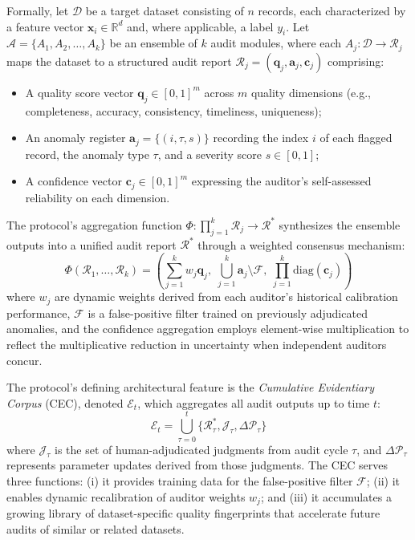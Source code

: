 \documentclass[12pt,a4paper]{ctexart}
\theoremstyle{definition}
\theoremstyle{remark}
\begin{document}
Formally, let $\mathcal{D}$ be a target dataset consisting of $n$ records, each characterized by a feature vector $\mathbf{x}_i \in \mathbb{R}^d$ and, where applicable, a label $y_i$. Let $\mathcal{A} = \{A_1, A_2, \ldots, A_k\}$ be an ensemble of $k$ audit modules, where each $A_j: \mathcal{D} \rightarrow \mathcal{R}_j$ maps the dataset to a structured audit report $\mathcal{R}_j = (\mathbf{q}_j, \mathbf{a}_j, \mathbf{c}_j)$ comprising:
\begin{itemize}
\item A quality score vector $\mathbf{q}_j \in [0,1]^m$ across $m$ quality dimensions (e.g., completeness, accuracy, consistency, timeliness, uniqueness);
\item An anomaly register $\mathbf{a}_j = \{(i, \tau, s)\}$ recording the index $i$ of each flagged record, the anomaly type $\tau$, and a severity score $s \in [0,1]$;
\item A confidence vector $\mathbf{c}_j \in [0,1]^m$ expressing the auditor's self-assessed reliability on each dimension.
\end{itemize}

The protocol's aggregation function $\Phi: \prod_{j=1}^k \mathcal{R}_j \rightarrow \mathcal{R}^*$ synthesizes the ensemble outputs into a unified audit report $\mathcal{R}^*$ through a weighted consensus mechanism:
\begin{equation}
\Phi(\mathcal{R}_1, \ldots, \mathcal{R}_k) = \left( \sum_{j=1}^k w_j \mathbf{q}_j, \; \bigcup_{j=1}^k \mathbf{a}_j \setminus \mathcal{F}, \; \prod_{j=1}^k \text{diag}(\mathbf{c}_j) \right)
\end{equation}
where $w_j$ are dynamic weights derived from each auditor's historical calibration performance, $\mathcal{F}$ is a false-positive filter trained on previously adjudicated anomalies, and the confidence aggregation employs element-wise multiplication to reflect the multiplicative reduction in uncertainty when independent auditors concur.

The protocol's defining architectural feature is the \textit{Cumulative Evidentiary Corpus} (CEC), denoted $\mathcal{E}_t$, which aggregates all audit outputs up to time $t$:
\begin{equation}
\mathcal{E}_t = \bigcup_{\tau=0}^{t} \{\mathcal{R}^*_\tau, \mathcal{J}_\tau, \Delta\mathcal{P}_\tau\}
\end{equation}
where $\mathcal{J}_\tau$ is the set of human-adjudicated judgments from audit cycle $\tau$, and $\Delta\mathcal{P}_\tau$ represents parameter updates derived from those judgments. The CEC serves three functions: (i) it provides training data for the false-positive filter $\mathcal{F}$; (ii) it enables dynamic recalibration of auditor weights $w_j$; and (iii) it accumulates a growing library of dataset-specific quality fingerprints that accelerate future audits of similar or related datasets.
\end{document}
